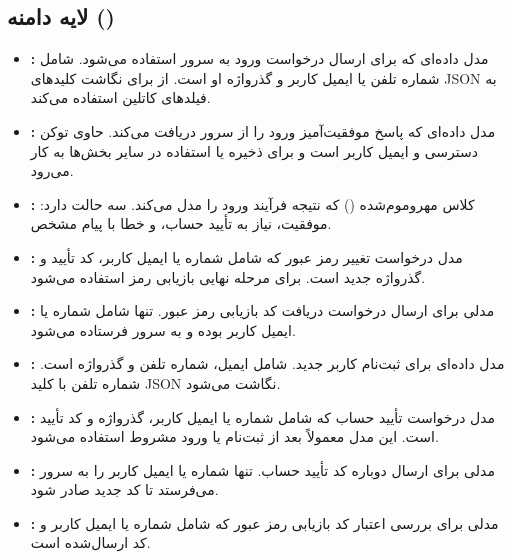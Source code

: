 \subsection{لایه دامنه ()}
\begin{itemize}
	\item \textbf{:} 
	مدل داده‌ای که برای ارسال درخواست ورود به سرور استفاده می‌شود. شامل شماره تلفن یا ایمیل کاربر و گذرواژه او است. از  برای نگاشت کلیدهای JSON به فیلدهای کاتلین استفاده می‌کند.
	
	\item \textbf{:} 
	مدل داده‌ای که پاسخ موفقیت‌آمیز ورود را از سرور دریافت می‌کند. حاوی توکن دسترسی و ایمیل کاربر است و برای ذخیره یا استفاده در سایر بخش‌ها به کار می‌رود.
	
	\item \textbf{:} 
	کلاس مهروموم‌شده () که نتیجه فرآیند ورود را مدل می‌کند. سه حالت دارد: موفقیت، نیاز به تأیید حساب، و خطا با پیام مشخص.
	
	\item \textbf{:} 
	مدل درخواست تغییر رمز عبور که شامل شماره یا ایمیل کاربر، کد تأیید و گذرواژه جدید است. برای مرحله نهایی بازیابی رمز استفاده می‌شود.
	
	\item \textbf{:} 
	مدلی برای ارسال درخواست دریافت کد بازیابی رمز عبور. تنها شامل شماره یا ایمیل کاربر بوده و به سرور فرستاده می‌شود.
	
	\item \textbf{:} 
	مدل داده‌ای برای ثبت‌نام کاربر جدید. شامل ایمیل، شماره تلفن و گذرواژه است. شماره تلفن با کلید JSON  نگاشت می‌شود.
	
	\item \textbf{:} 
	مدل درخواست تأیید حساب که شامل شماره یا ایمیل کاربر، گذرواژه و کد تأیید است. این مدل معمولاً بعد از ثبت‌نام یا ورود مشروط استفاده می‌شود.
	
	\item \textbf{:} 
	مدلی برای ارسال دوباره کد تأیید حساب. تنها شماره یا ایمیل کاربر را به سرور می‌فرستد تا کد جدید صادر شود.
	
	\item \textbf{:} 
	مدلی برای بررسی اعتبار کد بازیابی رمز عبور که شامل شماره یا ایمیل کاربر و کد ارسال‌شده است.
	

\end{itemize}
